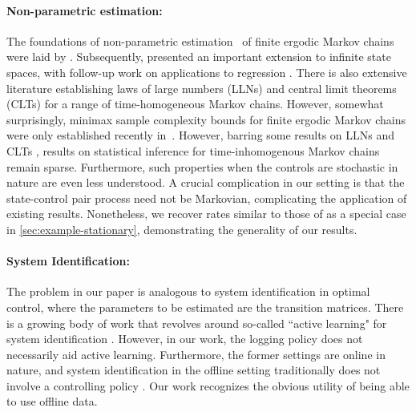 \documentclass[opre,sglanonrev]{informs4}
\numberwithin{equation}{section}
\begin{document}
{\paragraph{Non-parametric estimation:}  The foundations of non-parametric estimation~\citep{tsybakov2009introduction} of finite ergodic Markov chains were laid by \cite{billingsley1961statistical}. Subsequently, \cite{yakowitz1979nonparametric} presented an important extension to infinite state spaces, with follow-up work on applications to regression \citep{yakowitz1989nonparametric}. There is also extensive literature establishing laws of large numbers (LLNs) \citep{geyer1998markov} and central limit theorems (CLTs) \citep{jones2004markov} for a range of time-homogeneous Markov chains. However, somewhat surprisingly, minimax sample complexity bounds for finite ergodic Markov chains were only established recently in~\cite{wolfer2021statistical}. However, barring some results on LLNs and CLTs \citep{rosenblatt1963some,rosenblatt1964some,dobrushin1956central,dobrushin1956centralII}, results on statistical inference for time-inhomogenous Markov chains remain sparse.  Furthermore, such properties when the controls are stochastic in nature are even less understood. A crucial complication in our setting is that the state-control pair process need not be Markovian, complicating the application of existing results. Nonetheless, we recover rates similar to those of \cite{wolfer2021statistical} as a special case in \cref{sec:example-stationary}, demonstrating the generality of our results.

\paragraph{System Identification:} The problem in our paper is analogous to system identification in optimal control, \citep{vidyasagar2006learning,ljung2010perspectives,tangirala2018principles} where the parameters to be estimated are the transition matrices. 
There is a growing body of work that revolves around so-called ``active learning" for system identification \citep{mania2020active,chin2020active,raychaudhuri1996active}.  
However, in our work, the logging policy does not necessarily aid active learning.
Furthermore, the former settings are online in nature, and system identification in the offline setting traditionally does not involve a controlling policy \citep{ljung1987theory}.
Our work recognizes the obvious utility of being able to use offline data. 

}
\end{document}
